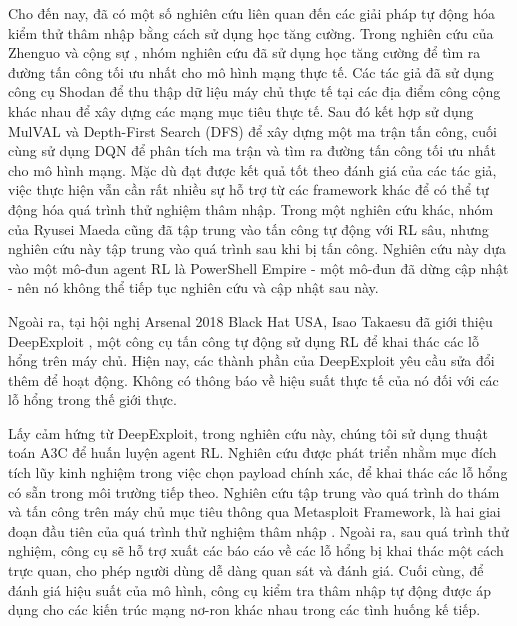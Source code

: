 Cho đến nay, đã có một số nghiên cứu liên quan đến các giải pháp tự động hóa kiểm thử thâm nhập bằng cách sử dụng học tăng cường. Trong nghiên cứu của Zhenguo và cộng sự \cite{hu2020automated}, nhóm nghiên cứu đã sử dụng học tăng cường để tìm ra đường tấn công tối ưu nhất cho mô hình mạng thực tế. Các tác giả đã sử dụng công cụ Shodan để thu thập dữ liệu máy chủ thực tế tại các địa điểm công cộng khác nhau để xây dựng các mạng mục tiêu thực tế. Sau đó kết hợp sử dụng MulVAL \cite{yousefi2018reinforcement} và Depth-First Search (DFS) để xây dựng một ma trận tấn công, cuối cùng sử dụng DQN để phân tích ma trận và tìm ra đường tấn công tối ưu nhất cho mô hình mạng. Mặc dù đạt được kết quả tốt theo đánh giá của các tác giả, việc thực hiện vẫn cần rất nhiều sự hỗ trợ từ các framework khác để có thể tự động hóa quá trình thử nghiệm thâm nhập. Trong một nghiên cứu khác, nhóm của Ryusei Maeda \cite{maeda2021automating} cũng đã tập trung vào tấn công tự động với RL sâu, nhưng nghiên cứu này tập trung vào quá trình sau khi bị tấn công. Nghiên cứu này dựa vào một mô-đun agent RL là PowerShell Empire - một mô-đun đã dừng cập nhật - nên nó không thể tiếp tục nghiên cứu và cập nhật sau này.

Ngoài ra, tại hội nghị Arsenal 2018 Black Hat USA, Isao Takaesu đã giới thiệu DeepExploit \cite{takaesudeepexploit}, một công cụ tấn công tự động sử dụng RL để khai thác các lỗ hổng trên máy chủ. Hiện nay, các thành phần của DeepExploit yêu cầu sửa đổi thêm để hoạt động. Không có thông báo về hiệu suất thực tế của nó đối với các lỗ hổng trong thế giới thực.

Lấy cảm hứng từ DeepExploit, trong nghiên cứu này, chúng tôi sử dụng thuật toán A3C \cite{mnih2016asynchronous} để huấn luyện agent RL. Nghiên cứu được phát triển nhằm mục đích tích lũy kinh nghiệm trong việc chọn payload chính xác, để khai thác các lỗ hổng có sẵn trong môi trường tiếp theo. Nghiên cứu tập trung vào quá trình do thám và  tấn công trên máy chủ mục tiêu thông qua Metasploit Framework, là hai giai đoạn đầu tiên của quá trình thử nghiệm thâm nhập \cite{engebretson2013basics}. Ngoài ra, sau quá trình thử nghiệm, công cụ sẽ hỗ trợ xuất các báo cáo về các lỗ hổng bị khai thác một cách trực quan, cho phép người dùng dễ dàng quan sát và đánh giá. Cuối cùng, để đánh giá hiệu suất của mô hình, công cụ kiểm tra thâm nhập tự động được áp dụng cho các kiến trúc mạng nơ-ron khác nhau trong các tình huống kế tiếp. 
